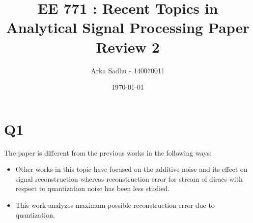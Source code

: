 \documentclass{article}
\title{EE 771 : Recent Topics in Analytical Signal Processing Paper Review 2}
\author{Arka Sadhu - 140070011}
\date{\today}
\begin{document}
\maketitle

\section*{Q1}
The paper is different from the previous works in the following ways:
\begin{itemize}
\item Other works in this topic have focused on the additive noise and its effect on signal reconstruction whereas reconstruction error for stream of diracs with respect to quantization noise has been less studied.
\item This work analyzes maximum possible reconstruction error due to quantization.
\end{itemize}
\end{document}
